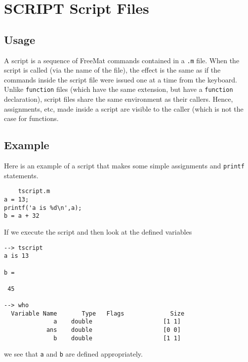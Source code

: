 \section{SCRIPT Script Files}

\subsection{Usage}

A script is a sequence of FreeMat commands contained in a
\verb|.m| file.  When the script is called (via the name of the
file), the effect is the same as if the commands inside the
script file were issued one at a time from the keyboard.
Unlike \verb|function| files (which have the same extension,
but have a \verb|function| declaration), script files share
the same environment as their callers.  Hence, assignments,
etc, made inside a script are visible to the caller (which
is not the case for functions.
\subsection{Example}

Here is an example of a script that makes some simple 
assignments and \verb|printf| statements.
\begin{verbatim}
    tscript.m
a = 13;
printf('a is %d\n',a);
b = a + 32
\end{verbatim}
If we execute the script and then look at the defined variables
\begin{verbatim}
--> tscript
a is 13

b = 

 45 

--> who
  Variable Name       Type   Flags             Size
              a    double                    [1 1]
            ans    double                    [0 0]
              b    double                    [1 1]
\end{verbatim}
we see that \verb|a| and \verb|b| are defined appropriately.
